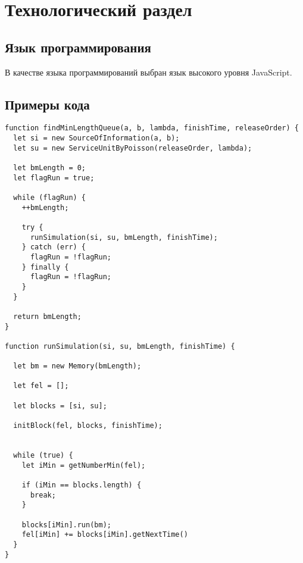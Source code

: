 \chapter{Технологический раздел}

\section{Язык программирования}
В качестве языка программирований выбран язык высокого уровня JavaScript.

\section{Примеры кода}

\begin{lstlisting}[caption={Событийный принцип: поиск минимального размера буферной памяти}]
function findMinLengthQueue(a, b, lambda, finishTime, releaseOrder) {
  let si = new SourceOfInformation(a, b);
  let su = new ServiceUnitByPoisson(releaseOrder, lambda);

  let bmLength = 0;
  let flagRun = true;

  while (flagRun) {
    ++bmLength;

    try {
      runSimulation(si, su, bmLength, finishTime);
    } catch (err) {
      flagRun = !flagRun;
    } finally {
      flagRun = !flagRun;
    }
  }

  return bmLength;
}

function runSimulation(si, su, bmLength, finishTime) {
  
  let bm = new Memory(bmLength);

  let fel = [];
  
  let blocks = [si, su];

  initBlock(fel, blocks, finishTime);


  while (true) {
    let iMin = getNumberMin(fel);

    if (iMin == blocks.length) {
      break;
    }

    blocks[iMin].run(bm);
    fel[iMin] += blocks[iMin].getNextTime()
  }
}
\end{lstlisting}

